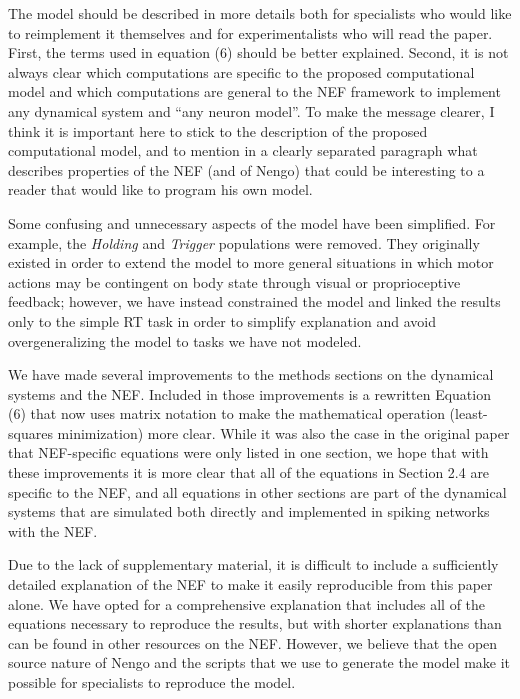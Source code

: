 \documentclass[11pt,paper=letter]{scrartcl}
\begin{document}
\begin{quoting}
  The model should be described in more details both for specialists
  who would like to reimplement it themselves and for experimentalists
  who will read the paper. First, the terms used in equation (6)
  should be better explained. Second, it is not always clear which
  computations are specific to the proposed computational model and
  which computations are general to the NEF framework to implement any
  dynamical system and ``any neuron model''. To make the message
  clearer, I think it is important here to stick to the description of
  the proposed computational model, and to mention in a clearly
  separated paragraph what describes properties of the NEF (and of
  Nengo) that could be interesting to a reader that would like to
  program his own model.
\end{quoting}

Some confusing and unnecessary aspects of the model
have been simplified.
For example, the \textit{Holding} and \textit{Trigger} populations
were removed.
They originally existed in order to extend
the model to more general situations
in which motor actions may be
contingent on body state
through visual or proprioceptive feedback;
however, we have instead constrained the model
and linked the results only to the simple RT task
in order to simplify explanation
and avoid overgeneralizing the model
to tasks we have not modeled.

We have made several improvements to
the methods sections on
the dynamical systems and the NEF.
Included in those improvements
is a rewritten Equation (6)
that now uses matrix notation
to make the mathematical operation
(least-squares minimization) more clear.
While it was also the case
in the original paper
that NEF-specific equations
were only listed in one section,
we hope that with these improvements
it is more clear that all of the equations
in Section 2.4 are specific to the NEF,
and all equations in other sections
are part of the dynamical systems
that are simulated both directly
and implemented in spiking networks with the NEF.

Due to the lack of supplementary material,
it is difficult to include
a sufficiently detailed explanation of the NEF
to make it easily reproducible
from this paper alone.
We have opted for a comprehensive
explanation that includes
all of the equations necessary
to reproduce the results,
but with shorter explanations
than can be found
in other resources on the NEF.
However, we believe that the open source nature
of Nengo and the scripts that we use
to generate the model
make it possible for specialists
to reproduce the model.
\end{document}
